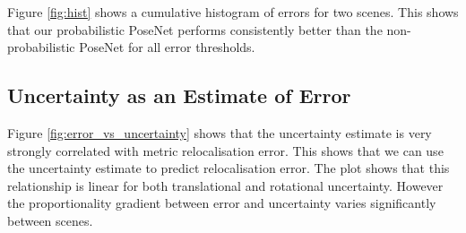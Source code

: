 Figure \ref{fig:hist} shows a cumulative histogram of errors for two scenes. This shows that our probabilistic PoseNet performs consistently better than the non-probabilistic PoseNet for all error thresholds.

\subsection{Uncertainty as an Estimate of Error}

Figure \ref{fig:error_vs_uncertainty} shows that the uncertainty estimate is very strongly correlated with metric relocalisation error. This shows that we can use the uncertainty estimate to predict relocalisation error. The plot shows that this relationship is linear for both translational and rotational uncertainty. However the proportionality gradient between error and uncertainty varies significantly between scenes.

